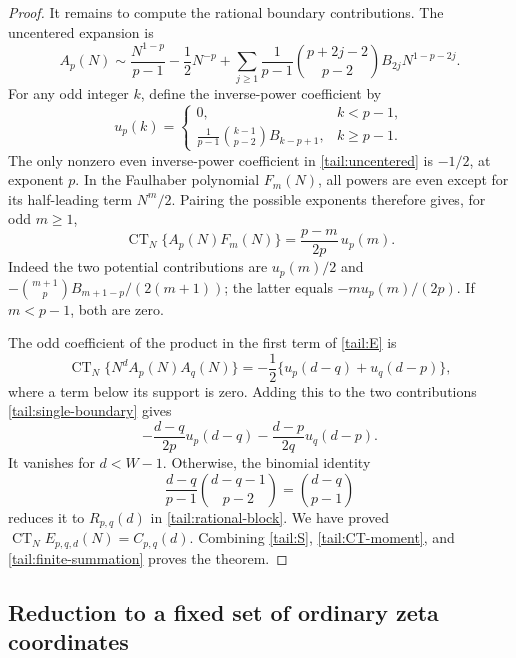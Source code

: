 \begin{proof}
It remains to compute the rational boundary contributions. The
uncentered expansion is
\begin{equation}\label{tail:uncentered}
 A_p(N)\sim\frac{N^{1-p}}{p-1}-\frac12N^{-p}
 +\sum_{j\ge1}\frac1{p-1}
       \binom{p+2j-2}{p-2}B_{2j}N^{1-p-2j}.
\end{equation}
For any odd integer \(k\), define the inverse-power coefficient by
\[
 u_p(k)=
 \begin{cases}
 0,&k<p-1,\\[2pt]
 \displaystyle\frac1{p-1}\binom{k-1}{p-2}B_{k-p+1},&k\ge p-1.
 \end{cases}
\]
The only nonzero even inverse-power coefficient in
\eqref{tail:uncentered} is \(-1/2\), at exponent \(p\).
In the Faulhaber polynomial \(F_m(N)\), all powers are even
except for its half-leading term \(N^m/2\). Pairing the possible
exponents therefore gives, for odd \(m\ge1\),
\begin{equation}\label{tail:single-boundary}
 \operatorname{CT}_N\{A_p(N)F_m(N)\}
       =\frac{p-m}{2p}\,u_p(m).
\end{equation}
Indeed the two potential contributions are
\(u_p(m)/2\) and
\(-\binom{m+1}{p}B_{m+1-p}/(2(m+1))\); the latter equals
\(-m u_p(m)/(2p)\). If \(m<p-1\), both are zero.

The odd coefficient of the product in the first term of
\eqref{tail:E} is
\[
 \operatorname{CT}_N\{N^dA_p(N)A_q(N)\}
      =-\frac12\{u_p(d-q)+u_q(d-p)\},
\]
where a term below its support is zero. Adding this to the two
contributions \eqref{tail:single-boundary} gives
\[
 -\frac{d-q}{2p}u_p(d-q)
 -\frac{d-p}{2q}u_q(d-p).
\]
It vanishes for \(d<W-1\). Otherwise, the binomial identity
\[
 \frac{d-q}{p-1}\binom{d-q-1}{p-2}
          =\binom{d-q}{p-1}
\]
reduces it to \(R_{p,q}(d)\) in \eqref{tail:rational-block}.
We have proved \(\operatorname{CT}_NE_{p,q,d}(N)=C_{p,q}(d)\).
Combining \eqref{tail:S}, \eqref{tail:CT-moment}, and
\eqref{tail:finite-summation} proves the theorem.
\end{proof}

\subsection{Reduction to a fixed set of ordinary zeta coordinates}

